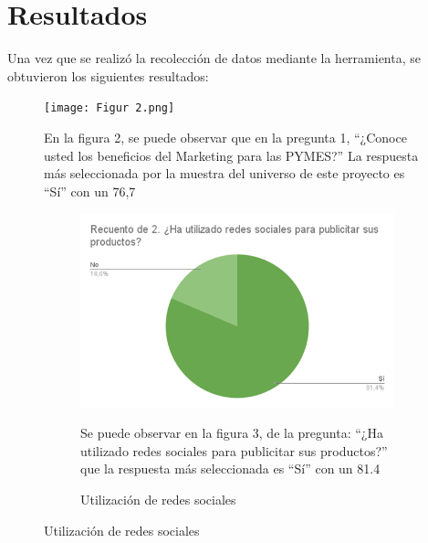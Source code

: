\documentclass[12pt]{difu100cia} %
\begin{document}
\section{Resultados}

Una vez que se realizó la recolección de datos mediante la herramienta, se obtuvieron los siguientes resultados: 
\begin{figure}[!htb]
	\centering
	\texttt{[image: Figur 2.png]}
	\caption{Del conocimiento de los beneficios del marketing digital}
	\label{diagrama_bloque_rfnoc}


En la figura 2, se puede observar que en la pregunta 1, “¿Conoce usted los beneficios del Marketing para las PYMES?” La respuesta más seleccionada por la muestra del universo de este proyecto es “Sí” con un 76,7%

\begin{figure}[!htb]
	\centering
	\includegraphics[width=\linewidth]{Figura 3.png}
	\caption{Utilización de redes sociales}
	\label{diagrama_bloque_rfnoc}

Se puede observar en la figura 3, de la pregunta: “¿Ha utilizado redes sociales para publicitar sus productos?” que la respuesta más seleccionada es “Sí” con un 81.4%


\end{figure}
\end{figure}
\end{document}
